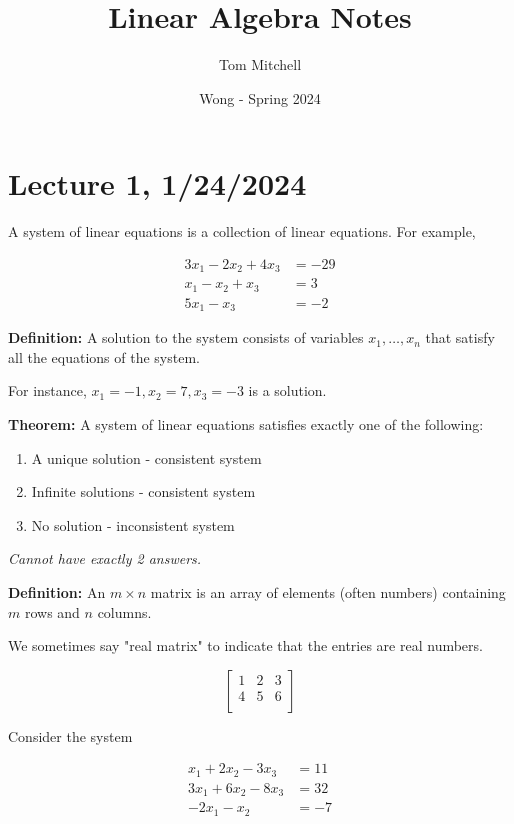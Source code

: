 \documentclass{article}
\title{Linear Algebra Notes}
\author{Tom Mitchell}
\date{Wong - Spring 2024}
\begin{document}
\maketitle

\section{Lecture 1, 1/24/2024}

A system of linear equations is a collection of linear equations. For example, 

\begin{align*}
    3x_1 - 2x_2 + 4x_3 &= -29 \\
    x_1 - x_2 + x_3 &= 3 \\
    5x_1 - x_3 &= -2
\end{align*}

\textbf{Definition:} A solution to the system consists of variables $x_1, \ldots , x_n$ that satisfy all the equations of the system.

For instance, $x_1=-1, x_2=7, x_3=-3$ is a solution.

\textbf{Theorem:} A system of linear equations satisfies exactly one of the following:
\begin{enumerate}
    \item A unique solution - consistent system
    \item Infinite solutions - consistent system
    \item No solution - inconsistent system
\end{enumerate}

\textit{Cannot have exactly 2 answers.}

\textbf{Definition:} An $m \times n$ matrix is an array of elements (often numbers) containing $m$ rows and $n$ columns.

We sometimes say "real matrix" to indicate that the entries are real numbers.

\[
\begin{bmatrix}
    1 & 2 & 3 \\
    4 & 5 & 6 \\
\end{bmatrix}
\]

Consider the system

\begin{align*}
    x_1 + 2x_2 - 3x_3 &= 11 \\
    3x_1 + 6x_2 - 8x_3 &= 32 \\
    -2x_1 - x_2 &= -7
\end{align*}
\end{document}
